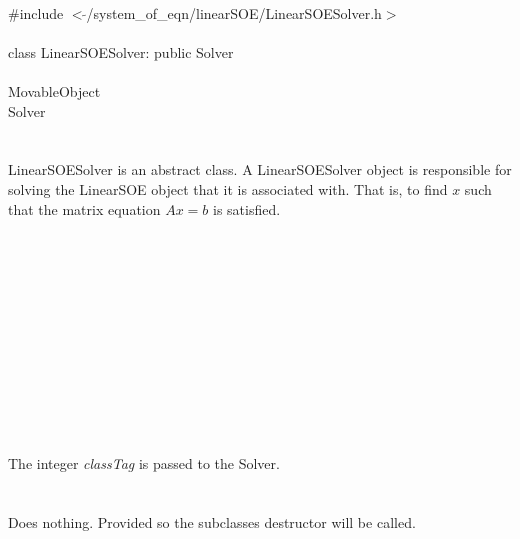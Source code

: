 
   \\
\indent \#include $<\tilde{ }$/system\_of\_eqn/linearSOE/LinearSOESolver.h$>$  \\

  \\
\indent class LinearSOESolver: public Solver  \\

 \\
\indent MovableObject \\
\indent\indent  Solver \\
\indent\indent{} \\

  \\
\indent LinearSOESolver is an abstract class. A LinearSOESolver object is
responsible for solving the LinearSOE object that it is associated
with. That is, to find $x$ such that the matrix equation $Ax=b$ is
satisfied. \\

  \\
\indent{} \\
\indent{}  \\ \\
\indent{} \\
\indent{}\\  \\
\indent{}  \\
\indent{} \\
\indent{} \\

  \\
  \\
The integer {\em classTag} is passed to the Solver. \\

 \\
\\ 
Does nothing. Provided so the subclasses destructor will be called. \\

